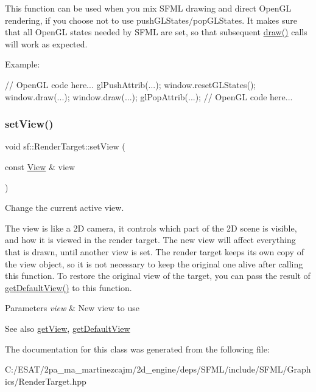 This function can be used when you mix S\+F\+ML drawing and direct Open\+GL rendering, if you choose not to use push\+G\+L\+States/pop\+G\+L\+States. It makes sure that all Open\+GL states needed by S\+F\+ML are set, so that subsequent \hyperlink{classsf_1_1_render_target_a12417a3bcc245c41d957b29583556f39}{draw()} calls will work as expected.

Example\+: 
\begin{DoxyCode}
\textcolor{comment}{// OpenGL code here...}
glPushAttrib(...);
window.resetGLStates();
window.draw(...);
window.draw(...);
glPopAttrib(...);
\textcolor{comment}{// OpenGL code here...}
\end{DoxyCode}
 \mbox{\label{classsf_1_1_render_target_a063db6dd0a14913504af30e50cb6d946}} 
\subsubsection{\texorpdfstring{set\+View()}{setView()}}
{\footnotesize\ttfamily void sf\+::\+Render\+Target\+::set\+View (\begin{DoxyParamCaption}\item[{const \hyperlink{classsf_1_1_view}{View} \&}]{view }\end{DoxyParamCaption})}



Change the current active view. 

The view is like a 2D camera, it controls which part of the 2D scene is visible, and how it is viewed in the render target. The new view will affect everything that is drawn, until another view is set. The render target keeps its own copy of the view object, so it is not necessary to keep the original one alive after calling this function. To restore the original view of the target, you can pass the result of \hyperlink{classsf_1_1_render_target_ad3b533c3f899d7044d981ed607aef9be}{get\+Default\+View()} to this function.


\begin{DoxyParams}{Parameters}
{\em view} & New view to use\\
\hline
\end{DoxyParams}
\begin{DoxySeeAlso}{See also}
\hyperlink{classsf_1_1_render_target_a2c179503b4dcdf5282ef6426d317602c}{get\+View}, \hyperlink{classsf_1_1_render_target_ad3b533c3f899d7044d981ed607aef9be}{get\+Default\+View} 
\end{DoxySeeAlso}


The documentation for this class was generated from the following file\+:\begin{DoxyCompactItemize}
\item 
C\+:/\+E\+S\+A\+T/2pa\+\_\+ma\+\_\+martinezcajm/2d\+\_\+engine/deps/\+S\+F\+M\+L/include/\+S\+F\+M\+L/\+Graphics/Render\+Target.\+hpp\end{DoxyCompactItemize}
